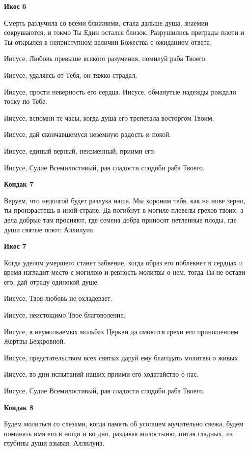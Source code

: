 \medskip


\bfseries Икос 6\normalfont{}


Смерть разлучила со всеми ближними, стала дальше душа, знаемии сокрушаются, и токмо Ты Един остался близок. Разрушились преграды плоти и Ты открылся в неприступном величии Божества с ожиданием ответа. 

Иисусе, Любовь превыше всякого разумения, помилуй раба Твоего. 

Иисусе, удаляясь от Тебя, он тяжко страдал. 

Иисусе, прости неверность его сердца. Иисусе, обманутые надежды рождали тоску по Тебе. 

Иисусе, вспомни те часы, когда душа его трепетала восторгом Твоим. 

Иисусе, дай скончавшемуся неземную радость и покой. 

Иисусе, единый верный, неизменный, приими его. 

Иисусе, Судие Всемилостивый, рая сладости сподоби раба Твоего.


\medskip


\bfseries Кондак 7\normalfont{}


Веруем, что недолгой будет разлука наша. Мы хороним тебя, как на ниве зерно, ты произрастешь в иной стране. Да погибнут в могиле плевелы грехов твоих, а дела добрые там просияют, где семена добра приносят нетленные плоды, где души святые поют: Аллилуиа.


\medskip


\bfseries Икос 7\normalfont{}


Когда уделом умершего станет забвение, когда образ его поблекнет в сердцах и время изгладит место с могилою и ревность молитвы о нем, тогда Ты не остави его, дай отраду одинокой душе. 

Иисусе, Твоя любовь не охладевает. 

Иисусе, неистощимо Твое благоволение. 

Иисусе, в неумолкаемых мольбах Церкви да омоются грехи его приношением Жертвы Безкровной. 

Иисусе, предстательством всех святых даруй ему благодать молитвы о живых. 

Иисусе, во дни испытаний наших приими его ходатайство о нас. 

Иисусе, Судие Всемилостивый, рая сладости сподоби раба Твоего.


\medskip


\bfseries Кондак 8\normalfont{}


Будем молиться со слезами, когда память об усопшем мучительно свежа, будем поминать имя его в нощи и во дни, раздавая милостыню, питая гладных, из глубины души взывая: Аллилуиа.


